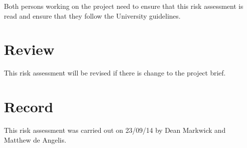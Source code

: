 \documentclass[a4paper]{article}
\begin{document}
Both persons working on the project need to ensure that this risk assessment is read and ensure that they follow the University guidelines. 

\section{Review}

This risk assessment will be revised if there is change to the project brief. 

\section{Record}

This risk assessment was carried out on 23/09/14 by Dean Markwick and Matthew de Angelis.  
\end{document}
